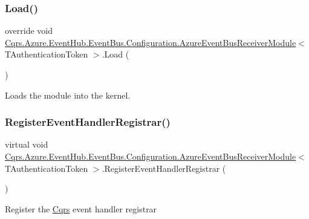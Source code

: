 \subsubsection{\texorpdfstring{Load()}{Load()}}
{\footnotesize\ttfamily override void \hyperlink{classCqrs_1_1Azure_1_1EventHub_1_1EventBus_1_1Configuration_1_1AzureEventBusReceiverModule}{Cqrs.\+Azure.\+Event\+Hub.\+Event\+Bus.\+Configuration.\+Azure\+Event\+Bus\+Receiver\+Module}$<$ T\+Authentication\+Token $>$.Load (\begin{DoxyParamCaption}{ }\end{DoxyParamCaption})}



Loads the module into the kernel. 

\mbox{\label{classCqrs_1_1Azure_1_1EventHub_1_1EventBus_1_1Configuration_1_1AzureEventBusReceiverModule_ad170174fa51db720544ead9fcd74ecea_ad170174fa51db720544ead9fcd74ecea}} 
\subsubsection{\texorpdfstring{Register\+Event\+Handler\+Registrar()}{RegisterEventHandlerRegistrar()}}
{\footnotesize\ttfamily virtual void \hyperlink{classCqrs_1_1Azure_1_1EventHub_1_1EventBus_1_1Configuration_1_1AzureEventBusReceiverModule}{Cqrs.\+Azure.\+Event\+Hub.\+Event\+Bus.\+Configuration.\+Azure\+Event\+Bus\+Receiver\+Module}$<$ T\+Authentication\+Token $>$.Register\+Event\+Handler\+Registrar (\begin{DoxyParamCaption}{ }\end{DoxyParamCaption})\hspace{0.3cm}{\ttfamily [virtual]}}



Register the \hyperlink{namespaceCqrs}{Cqrs} event handler registrar 



